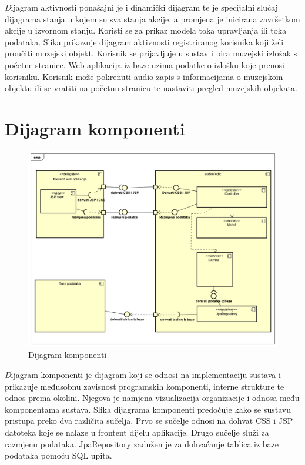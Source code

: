 		\textit Dijagram aktivnosti ponašajni je i dinamički dijagram te je specijalni slučaj dijagrama stanja u kojem su sva stanja akcije, a promjena je inicirana završetkom akcije u izvornom stanju. Koristi se za prikaz modela toka upravljanja ili toka podataka. Slika prikazuje dijagram aktivnosti registriranog korisnika koji želi proučiti muzejski objekt. Korisnik se prijavljuje u sustav i bira muzejski izložak s početne stranice. Web-aplikacija iz baze uzima podatke o izlošku koje prenosi korisniku. Korisnik može pokrenuti audio zapis s informacijama o muzejskom objektu ili se vratiti na početnu stranicu te nastaviti pregled muzejskih objekata.
		
		\eject
		\section{Dijagram komponenti}
		    \begin{figure}[H]
				\includegraphics[scale=0.5]{slike/dijagram_komponenti.png}
				\centering
				\caption{Dijagram komponenti}
				\label{fig:promjene}
			\end{figure}
		
		\textit Dijagram komponenti je dijagram koji se odnosi na implementaciju sustava i prikazuje međusobnu zavisnost programskih komponenti, interne strukture te odnos prema okolini. Njegova je namjena vizualizacija organizacije i odnosa među komponentama sustava. Slika dijagrama komponenti predočuje kako se sustavu pristupa preko dva različita sučelja. Prvo se sučelje odnosi na dohvat CSS i JSP datoteka koje se nalaze u frontent dijelu aplikacije. Drugo sučelje služi za razmjenu podataka. JpaRepository zadužen je za dohvaćanje tablica iz baze podataka pomoću SQL upita.
